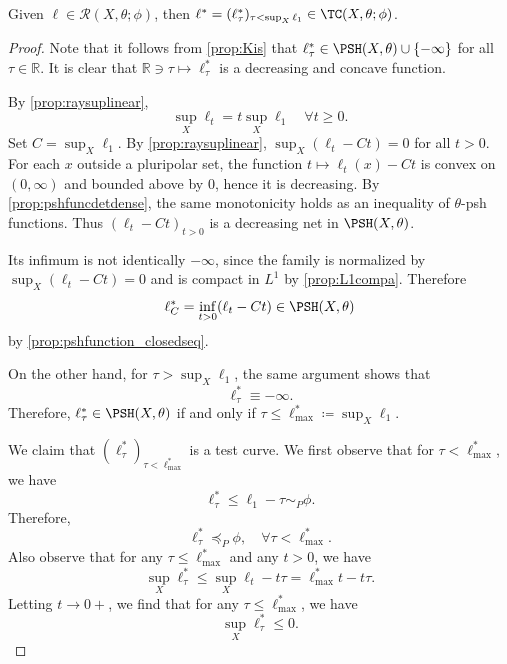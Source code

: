 \begin{lemma}\label{lma:LegendsRtoTC}
    Given $\ell\in \mathcal{R}(X,\theta;\phi)$, then $\ell^*=(\ell^*_\tau)_{\tau<\sup_X \ell_1}\in \TC(X,\theta;\phi)$.
\end{lemma}
\begin{proof}
    Note that it follows from \cref{prop:Kis} that $\ell^*_{\tau}\in \PSH(X,\theta)\cup \{-\infty\}$ for all $\tau\in \mathbb{R}$. It is clear that $\mathbb{R}\ni \tau\mapsto \ell^*_{\tau}$ is a decreasing and concave function.

    By \cref{prop:raysuplinear},
    \[
    \sup_X\ell_t= t\sup_X \ell_1 \quad \forall t\geq 0.
    \]
    Set $C=\sup_X\ell_1$. By \cref{prop:raysuplinear}, $\sup_X(\ell_t-Ct)=0$ for all $t>0$. For each $x$ outside a pluripolar set, the function $t\mapsto \ell_t(x)-Ct$ is convex on $(0,\infty)$ and bounded above by $0$, hence it is decreasing. By \cref{prop:pshfuncdetdense}, the same monotonicity holds as an inequality of $\theta$-psh functions. Thus $(\ell_t-Ct)_{t>0}$ is a decreasing net in $\PSH(X,\theta)$.

    Its infimum is not identically $-\infty$, since the family is normalized by $\sup_X(\ell_t-Ct)=0$ and is compact in $L^1$ by \cref{prop:L1compa}. Therefore
    \[
        \ell^*_{C}=\inf_{t>0}(\ell_t-Ct)\in \PSH(X,\theta)
    \]
    by \cref{prop:pshfunction_closedseq}.

    On the other hand, for $\tau>\sup_X \ell_1$, the same argument shows that
    \[
    \ell^*_{\tau}\equiv -\infty.
    \]
    Therefore, $\ell^*_{\tau}\in \PSH(X,\theta)$ if and only if $\tau\leq \ell^*_{\max}\coloneqq \sup_X \ell_1$.

    We claim that $(\ell^*_{\tau})_{\tau<\ell^*_{\max}}$ is a test curve. We first observe that for $\tau<\ell^*_{\max}$, we have
    \[
    \ell^*_{\tau}\leq \ell_1-\tau\sim_P \phi.
    \]
    Therefore,
    \begin{equation}\label{eq:elltaupreceqpphi}
        \ell^*_{\tau}\preceq_P \phi,\quad \forall \tau<\ell^*_{\max}.
    \end{equation}
    Also observe that for any $\tau\leq \ell^*_{\max}$ and any $t>0$, we have
    \[
    \sup_X \ell^*_{\tau}\leq \sup_X \ell_t-t\tau=\ell^*_{\max}t-t\tau.
    \]
    Letting $t\to 0+$, we find that for any $\tau\leq \ell^*_{\max}$, we have
    \begin{equation}\label{eq:supXelltaustarnegtemp1}
    \sup_X \ell^*_{\tau}\leq 0.
    \end{equation}


\end{proof}
